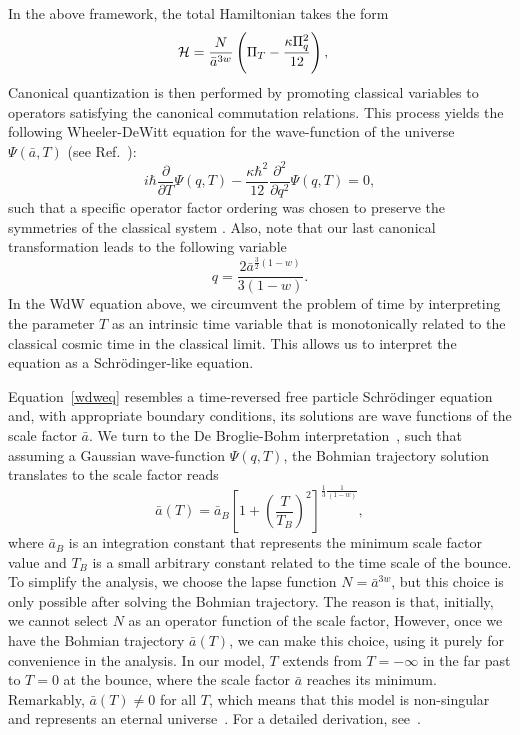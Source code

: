 \documentclass[a4paper,11pt]{article}
\newcommand{\dpar}[1]{\left(#1 \right)}
\newcommand{\dcol}[1]{\left[#1 \right]}
\begin{document}
In the above framework, the total Hamiltonian takes the form
\begin{align}
	\label{total_hamiltonian_FLRW}
	{\cal H} & = \frac{N}{\bar{a}^{3w}}\dpar{\Pi_{T}- \frac{\kappa\Pi_q^{2} }{12}} ,
\end{align}
Canonical quantization is then performed by promoting classical variables to operators
satisfying the canonical commutation relations. This process yields the following
Wheeler-DeWitt equation for the wave-function of the universe  $\Psi(\bar{a}, T)$ (see
Ref.~\cite{nelson_peter_bouncing_original}):
\begin{equation}
	\label{wdweq}
	i\hbar\frac{\partial}{\partial T}\Psi(q,T) -
	\frac{\kappa\hbar^2}{12}\frac{\partial^{2}}{\partial q^{2}}\Psi(q,T)  = 0 ,
\end{equation}
such that a specific operator factor ordering was chosen to preserve the symmetries of
the classical system \cite{halliwell1990introductory}. Also, note that our last
canonical transformation leads to the following variable
\begin{equation}
	q = \frac{2\bar{a}^{\frac{3}{2}\dpar{1-w} } }{ 3\dpar{1-w } }.
\end{equation}
In the WdW equation above, we circumvent the problem of time by interpreting the
parameter $T$ as an intrinsic time variable that is monotonically related to the
classical cosmic time in the classical limit. This allows us to interpret the equation
as a Schrödinger-like equation.

Equation~\eqref{wdweq} resembles a time-reversed free particle Schrödinger equation and,
with appropriate boundary conditions, its solutions are wave functions of the scale
factor $\bar{a}$. We turn to the De Broglie-Bohm
interpretation~\cite{mukhanov2005physical, nelson2000bohm}, such that assuming a Gaussian
wave-function $\Psi(q, T)$, the Bohmian trajectory solution translates to the scale
factor reads
\begin{equation}
	\label{bohm_scale_factor}
	\bar{a}(T) = \bar{a}_{B}\dcol{1 + \dpar{ \frac{T}{T_{ B}} }^2 }^{{\frac{1}{3}\frac{1}{\dpar{1-w}} } }  ,
\end{equation}
where $\bar{a}_{B}$ is an integration constant that represents the minimum scale factor
value and $T_B$ is a small arbitrary constant related to the time scale of the bounce.
To simplify the analysis, we choose the lapse function $N = \bar{a}^{3w}$, but this
choice is only possible after solving the Bohmian trajectory. The reason is that,
initially, we cannot select $N$ as an operator function of the scale factor, However,
once we have the Bohmian trajectory $\bar{a}(T)$, we can make this choice, using it
purely for convenience in the analysis. In our model, $T$ extends from $T = -\infty$ in
the far past to $T = 0$ at the bounce, where the scale factor $\bar{a}$ reaches its
minimum. Remarkably, $\bar{a}(T) \neq 0$ for all $T$, which means that this model is
non-singular and represents an eternal universe~\cite{nelson_peter_bouncing_original}.
For a detailed derivation, see~\cite{nelson2021bouncing}.
\end{document}
